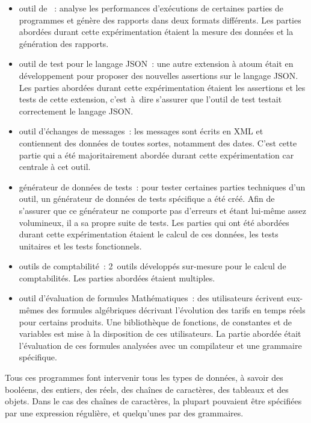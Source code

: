 \begin{itemize}

\item outil de ~: analyse les performances d'exécutions de
certaines parties de programmes et génère des rapports dans deux formats
différents. Les parties abordées durant cette expérimentation étaient la mesure
des données et la génération des rapports.

\item outil de test pour le langage JSON~: une autre extension à atoum était en
développement pour proposer des nouvelles assertions sur le langage JSON. Les
parties abordées durant cette expérimentation étaient les assertions et les
tests de cette extension, c'est~à~dire s'assurer que l'outil de test testait
correctement le langage JSON.

\item outil d'échanges de messages~: les messages sont écrits en XML et
contiennent des données de toutes sortes, notamment des dates. C'est cette
partie qui a été majoritairement abordée durant cette expérimentation car
centrale à cet outil.

\item générateur de données de tests~: pour tester certaines parties techniques
d'un outil, un générateur de données de tests spécifique a été créé. Afin de
s'assurer que ce générateur ne comporte pas d'erreurs et étant lui-même assez
volumineux, il a sa propre suite de tests. Les parties qui ont été abordées
durant cette expérimentation étaient le calcul de ces données, les tests
unitaires et les tests fonctionnels.

\item outils de comptabilité~: 2~outils développés sur-mesure pour le calcul de
comptabilités. Les parties abordées étaient multiples.

\item outil d'évaluation de formules Mathématiques~: des utilisateurs écrivent
eux-mêmes des formules algébriques décrivant l'évolution des tarifs en temps
réels pour certains produits. Une bibliothèque de fonctions, de constantes et de
variables est mise à la disposition de ces utilisateurs. La partie abordée était
l'évaluation de ces formules analysées avec un compilateur et une grammaire
spécifique.

\end{itemize}

Tous ces programmes font intervenir tous les types de données, à savoir des
booléens, des entiers, des réels, des chaînes de caractères, des tableaux et des
objets. Dans le cas des chaînes de caractères, la plupart pouvaient être
spécifiées par une expression régulière, et quelqu'unes par des grammaires.

